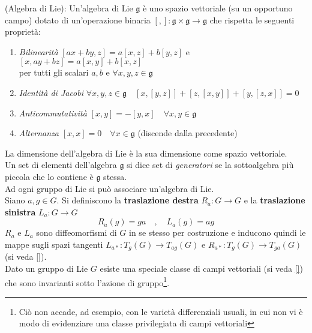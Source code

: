 \begin{definition}{(Algebra di Lie):}\label{def:LieAlgebra}
   Un'algebra di Lie $\mathfrak{g}$ è uno spazio vettoriale (su un opportuno campo)
   dotato di un'operazione binaria $[,] : \mathfrak{g} \times \mathfrak{g} \to \mathfrak{g}$
   che rispetta le seguenti proprietà:
   \begin{enumerate}
       \item \emph{Bilinearità} \quad $[ax+by,z] = a[x,z]+b[y,z]$ \quad e \quad
          $[x,ay+bz] = a[x,y] + b[x,z]$ \\
          per tutti gli scalari $a,b$ e $\forall x,y,z \in \mathfrak{g}$
       \item \emph{Identità di Jacobi} \quad $\forall x,y,z \in \mathfrak{g} \quad
          [x,[y,z]] + [z,[x,y]] + [y,[z,x]] = 0$
       \item \emph{Anticommutatività} \quad $[x,y] = -[y,x] \quad
          \forall x,y \in \mathfrak{g} $
       \item \emph{Alternanza} \quad $[x,x]=0 \quad \forall x \in \mathfrak{g}$ \quad
          (discende dalla precedente)
   \end{enumerate}
\end{definition}
La dimensione dell'algebra di Lie è la sua dimensione come spazio vettoriale.\\
Un set di elementi dell'algebra $\mathfrak{g}$ si dice set di \emph{generatori}
se la sottoalgebra più piccola che lo contiene è $\mathfrak{g}$ stessa.\\

Ad ogni gruppo di Lie si può associare un'algebra di Lie.\\

Siano $a,g \in G$. Si definiscono la \textbf{traslazione destra} $R_a : G \to G$
e la \textbf{traslazione sinistra} $L_a : G \to G$
$$
   R_a(g) = ga \quad,\quad L_a(g) = ag
$$
$R_a$ e $L_a$ sono diffeomorfismi di $G$ in se stesso per costruzione e inducono
quindi le mappe sugli spazi tangenti $L_{a*} : T_g(G) \to T_{ag}(G)$ e
$R_{a*} : T_g(G) \to T_{ga}(G)$ (si veda \ref{}).\\

Dato un gruppo di Lie $G$ esiste una speciale classe di campi vettoriali
(si veda \ref{}) che sono invarianti sotto l'azione di gruppo\footnote{
Ciò non accade, ad esempio, con le varietà differenziali usuali, in cui non vi è
modo di evidenziare una classe privilegiata di campi vettoriali
}.\\

